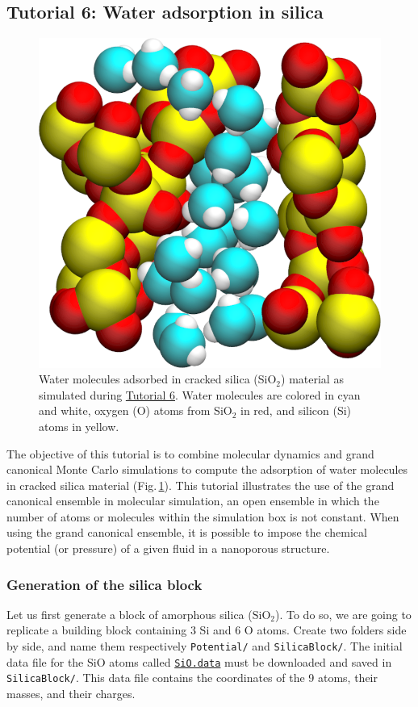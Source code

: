 \documentclass[9pt,tutorial]{livecoms}
\newcommand{\flrcmd}[1]{\textcolor{command}{\texttt{#1}}} %
\newcommand{\dwlcmd}[1]{\textcolor{download}{\texttt{#1}}} %
\newcommand{\filepath}{https://raw.githubusercontent.com/lammpstutorials/lammpstutorials-article/main/files/}
\begin{document}
\subsection{Tutorial 6: Water adsorption in silica}
\label{gcmc-silica-label}

\begin{figure}
\centering
\includegraphics[width=0.55\linewidth]{GCMC}
\caption{Water molecules adsorbed in cracked silica (SiO$_2$) material as simulated
during \hyperref[gcmc-silica-label]{Tutorial 6}. Water molecules are colored in
cyan and white, oxygen (O) atoms from SiO$_2$ in red, and silicon (Si) atoms in yellow.}
\label{fig:GCMC}
\end{figure}

\noindent The objective of this tutorial is to combine molecular dynamics and
grand canonical Monte Carlo simulations to compute the adsorption of water
molecules in cracked silica material (Fig.\,\ref{fig:GCMC}). This tutorial
illustrates the use of the grand canonical ensemble in molecular simulation, an
open ensemble in which the number of atoms or molecules within the simulation
box is not constant. When using the grand canonical ensemble, it is possible to
impose the chemical potential (or pressure) of a given fluid in a nanoporous structure.

\subsubsection{Generation of the silica block}
\noindent Let us first generate a block of amorphous silica ($\text{SiO}_2$).
To do so, we are going to replicate a building block containing 3 Si and 6 O atoms.
Create two folders side by side, and name them respectively \flrcmd{Potential/}
and \flrcmd{SilicaBlock/}. The initial data file for the SiO atoms called
\href{\filepath tutorial6/SiO.data}{\dwlcmd{SiO.data}}
must be downloaded and saved in \flrcmd{SilicaBlock/}. This data file contains
the coordinates of the 9 atoms, their masses, and their charges.
\end{document}
